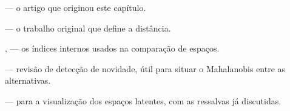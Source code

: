 \begin{leituras}
\item \citet{Lopes2026OTC} --- o artigo que originou este capítulo.
\item \citet{Mahalanobis1936} --- o trabalho original que define a distância.
\item \citet{Rousseeuw1987}, \citet{Calinski1974} --- os índices internos usados na
      comparação de espaços.
\item \citet{Pimentel2014review} --- revisão de detecção de novidade, útil para situar o
      Mahalanobis entre as alternativas.
\item \citet{maaten2008visualizing} --- para a visualização dos espaços latentes, com as
      ressalvas já discutidas.
\end{leituras}
